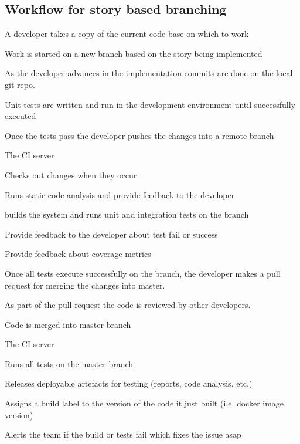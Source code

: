 \documentclass[a4paper,
               keeplastbox,   %
               ]{jacow}
\begin{document}
\subsection{Workflow for story based branching }
\begin{Itemize}
    \item A developer takes a copy of the current code base on which to work
    \item Work is started on a new branch based on the story being implemented
    \item As  the developer advances in the implementation commits are done on the local git repo. 
    \item Unit tests are written and run in the development environment until successfully executed
    \item Once the tests pass the developer pushes the changes into a remote branch
    \item The CI server 
    \begin{Itemize}
        \item Checks out changes when they occur
        \item Runs static code analysis and provide feedback to the developer
        \item builds the system and runs unit and integration tests on the branch
        \item Provide feedback to the developer about test fail or success
        \item Provide feedback about coverage metrics
    \end{Itemize}
    \item Once all tests execute successfully on the branch, the developer makes a pull request for merging the changes into master.
    \item As part of the pull request the code is reviewed by other developers.
    \item Code is merged into master branch
    \item The CI server 
    \begin{Itemize}
        \item Runs all tests on the master branch
        \item Releases deployable artefacts for testing (reports, code analysis, etc.)
        \item Assigns a build label to the version of the code it just built (i.e. docker image version)
        \item Alerts the team if the build or tests fail which fixes the issue asap
    \end{Itemize}
\end{Itemize}
\end{document}
